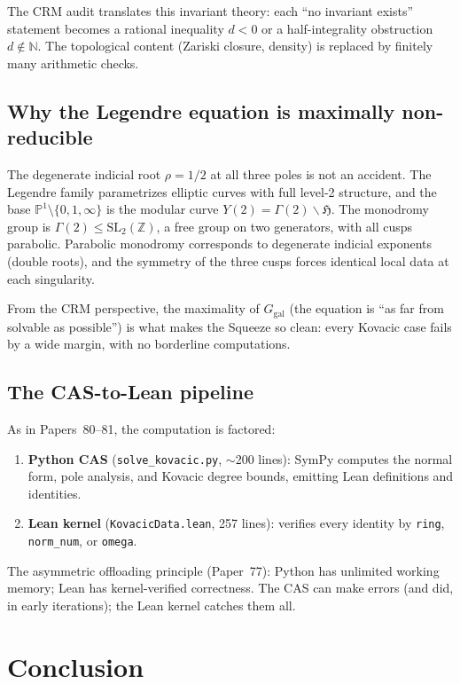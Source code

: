 \documentclass[11pt]{article}
\theoremstyle{plain}
\theoremstyle{definition}
\theoremstyle{remark}
\newcommand{\N}{\mathbb{N}}
\newcommand{\Z}{\mathbb{Z}}
\newcommand{\SL}{\mathrm{SL}}
\newcommand{\Ggal}{G_{\mathrm{gal}}}
\begin{document}
\noindent
The CRM audit translates this invariant theory: each ``no invariant exists'' statement becomes a rational inequality $d < 0$ or a half-integrality obstruction $d \notin \N$.
The topological content (Zariski closure, density) is replaced by finitely many arithmetic checks.

\subsection{Why the Legendre equation is maximally non-reducible}

The degenerate indicial root $\rho = 1/2$ at all three poles is not an accident.
The Legendre family parametrizes elliptic curves with full level-2 structure, and the base $\mathbb{P}^1 \setminus \{0,1,\infty\}$ is the modular curve $Y(2) = \Gamma(2) \backslash \mathfrak{H}$.
The monodromy group is $\Gamma(2) \leq \SL_2(\Z)$, a free group on two generators, with all cusps parabolic.
Parabolic monodromy corresponds to degenerate indicial exponents (double roots), and the symmetry of the three cusps forces identical local data at each singularity.

From the CRM perspective, the maximality of $\Ggal$ (the equation is ``as far from solvable as possible'') is what makes the Squeeze so clean: every Kovacic case fails by a wide margin, with no borderline computations.

\subsection{The CAS-to-Lean pipeline}

As in Papers~80--81, the computation is factored:
\begin{enumerate}
  \item \textbf{Python CAS} (\texttt{solve\_kovacic.py}, $\sim$200 lines): SymPy computes the normal form, pole analysis, and Kovacic degree bounds, emitting Lean definitions and identities.
  \item \textbf{Lean kernel} (\texttt{KovacicData.lean}, 257 lines): verifies every identity by \texttt{ring}, \texttt{norm\_num}, or \texttt{omega}.
\end{enumerate}
The asymmetric offloading principle (Paper~77): Python has unlimited working memory; Lean has kernel-verified correctness.
The CAS can make errors (and did, in early iterations); the Lean kernel catches them all.

\section{Conclusion}
\label{sec:conclusion}
\end{document}
